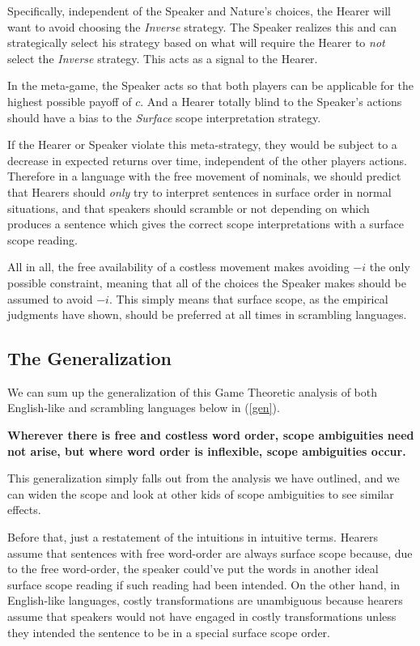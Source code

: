 \documentclass{article}
\begin{document}
Specifically, independent of the Speaker and Nature's choices, the Hearer will want to avoid choosing the \emph{Inverse} strategy.
The Speaker realizes this and can strategically select his strategy based on what will require the Hearer to \emph{not} select the \emph{Inverse} strategy.
This acts as a signal to the Hearer.

In the meta-game, the Speaker acts so that both players can be applicable for the highest possible payoff of $c$.
And a Hearer totally blind to the Speaker's actions should have a bias to the \emph{Surface} scope interpretation strategy.

If the Hearer or Speaker violate this meta-strategy, they would be subject to a decrease in expected returns over time, independent of the other players actions.
Therefore in a language with the free movement of nominals, we should predict that Hearers should \emph{only} try to interpret sentences in surface order in normal situations, and that speakers should scramble or not depending on which produces a sentence which gives the correct scope interpretations with a surface scope reading.

All in all, the free availability of a costless movement makes avoiding $-i$ the only possible constraint, meaning that all of the choices the Speaker makes should be assumed to avoid $-i$.
This simply means that surface scope, as the empirical judgments have shown, should be preferred at all times in scrambling languages.

\subsection{The Generalization}

We can sum up the generalization of this Game Theoretic analysis of both English-like and scrambling languages below in (\ref{gen}).

\begin{exe}
\ex \textbf{Wherever there is free and costless word order, scope ambiguities need not arise, but where word order is inflexible, scope ambiguities occur.
\label{gen}}
\end{exe}

This generalization simply falls out from the analysis we have outlined, and we can widen the scope and look at other kids of scope ambiguities to see similar effects.

Before that, just a restatement of the intuitions in intuitive terms.
Hearers assume that sentences with free word-order are always surface scope because, due to the free word-order, the speaker could've put the words in another ideal surface scope reading if such reading had been intended.
On the other hand, in English-like languages, costly transformations are unambiguous because hearers assume that speakers would not have engaged in costly transformations unless they intended the sentence to be in a special surface scope order.
\end{document}
